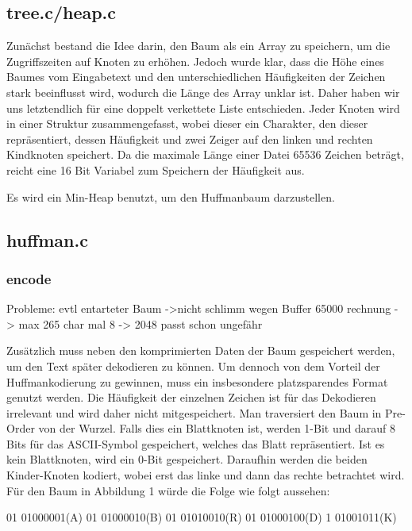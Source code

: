 \documentclass[course=erap]{aspdoc}
\begin{document}
\subsection{tree.c/heap.c}

Zunächst bestand die Idee darin, den Baum als ein Array zu speichern, um die Zugriffszeiten auf Knoten zu erhöhen. Jedoch wurde klar, dass die Höhe eines Baumes vom Eingabetext und den unterschiedlichen Häufigkeiten der Zeichen stark beeinflusst wird, wodurch die Länge des Array unklar ist. Daher haben wir uns letztendlich für eine doppelt verkettete Liste entschieden. Jeder Knoten wird in einer Struktur zusammengefasst, wobei dieser ein Charakter, den dieser repräsentiert, dessen Häufigkeit und zwei Zeiger auf den linken und rechten Kindknoten speichert. Da die maximale Länge einer Datei 65536 Zeichen beträgt, reicht eine 16 Bit Variabel zum Speichern der Häufigkeit aus.

Es wird ein Min-Heap benutzt, um den Huffmanbaum darzustellen.



\subsection{huffman.c}
\subsubsection{encode}

Probleme: evtl entarteter Baum ->nicht schlimm wegen Buffer 65000 rechnung -> max 265 char mal 8 -> 2048 passt schon ungefähr

Zusätzlich muss neben den komprimierten Daten der Baum gespeichert werden, um den Text später dekodieren zu können. Um dennoch von dem Vorteil der Huffmankodierung zu gewinnen, muss ein insbesondere platzsparendes Format genutzt werden. Die Häufigkeit der einzelnen Zeichen ist für das Dekodieren irrelevant und wird daher nicht mitgespeichert.
Man traversiert den Baum in Pre-Order von der Wurzel. Falls dies ein Blattknoten ist, werden 1-Bit und darauf 8 Bits für das ASCII-Symbol gespeichert, welches das Blatt repräsentiert. Ist es kein Blattknoten, wird ein 0-Bit gespeichert. Daraufhin werden die beiden Kinder-Knoten kodiert, wobei erst das linke und dann das rechte betrachtet wird.
Für den Baum in Abbildung 1 würde die Folge wie folgt aussehen:

\begin{center}
    01 01000001(A) 01 01000010(B) 01 01010010(R) 01 01000100(D) 1 01001011(K)
\end{center}
\end{document}
